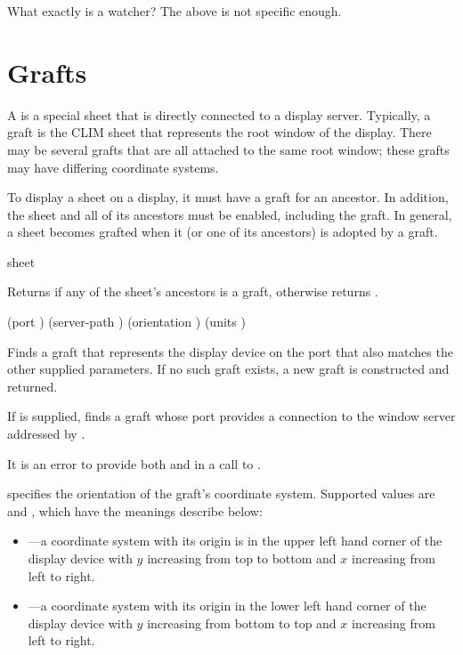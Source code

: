  {What exactly is a watcher?  The above is not specific enough.}


\section {Grafts}

A  is a special sheet that is directly connected to a display
server.  Typically, a graft is the CLIM sheet that represents the root window of
the display.  There may be several grafts that are all attached to the same root
window; these grafts may have differing coordinate systems.

To display a sheet on a display, it must have a graft for an ancestor.  In
addition, the sheet and all of its ancestors must be enabled, including the
graft.  In general, a sheet becomes grafted when it (or one of its ancestors) is
adopted by a graft.

 {sheet}

Returns  if any of the sheet's ancestors is a graft, otherwise
returns .


 {\key (port ) (server-path )
                          (orientation ) (units )}

Finds a graft that represents the display device on the port  that
also matches the other supplied parameters.  If no such graft exists, a new
graft is constructed and returned.

If  is supplied,  finds a graft whose port
provides a connection to the window server addressed by .

It is an error to provide both  and  in a call to
.

 specifies the orientation of the graft's coordinate
system.  Supported values are  and , which have the
meanings describe below:

\begin{itemize}
\item {}---a coordinate system with its origin is in the upper left
hand corner of the display device with $y$ increasing from top to bottom and $x$
increasing from left to right.

\item {}---a coordinate system with its origin in the lower left
hand corner of the display device with $y$ increasing from bottom to top and $x$
increasing from left to right.
\end{itemize}

